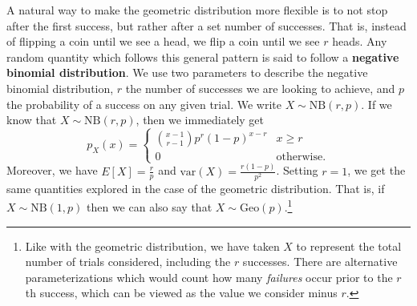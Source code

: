 \documentclass[
  letterpaper,
  DIV=11,
  numbers=noendperiod]{scrreprt}
\theoremstyle{definition}
\theoremstyle{definition}
\theoremstyle{definition}
\theoremstyle{remark}
\begin{document}
A natural way to make the geometric distribution more flexible is to not
stop after the first success, but rather after a set number of
successes. That is, instead of flipping a coin until we see a head, we
flip a coin until we see \(r\) heads. Any random quantity which follows
this general pattern is said to follow a \textbf{negative binomial
distribution}. We use two parameters to describe the negative binomial
distribution, \(r\) the number of successes we are looking to achieve,
and \(p\) the probability of a success on any given trial. We write
\(X\sim\text{NB}(r,p)\). If we know that \(X\sim\text{NB}(r,p)\), then
we immediately get
\[p_X(x) = \begin{cases}\binom{x-1}{r-1}p^r(1-p)^{x-r} & x\geq r \\ 0 &\text{otherwise}.\end{cases}\]
Moreover, we have \(E[X] = \frac{r}{p}\) and
\(\text{var}(X) = \frac{r(1-p)}{p^2}\). Setting \(r=1\), we get the same
quantities explored in the case of the geometric distribution. That is,
if \(X \sim \text{NB}(1,p)\) then we can also say that
\(X \sim \text{Geo}(p)\).\footnote{Like with the geometric distribution,
  we have taken \(X\) to represent the total number of trials
  considered, including the \(r\) successes. There are alternative
  parameterizations which would count how many \emph{failures} occur
  prior to the \(r\)th success, which can be viewed as the value we
  consider minus \(r\).}
\end{document}
